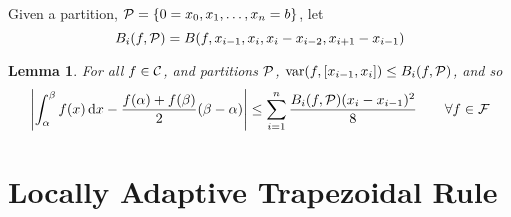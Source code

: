\documentclass{amsart}
\newtheorem{lem}[thm]{Lemma}
\DeclareMathOperator{\Var}{var}
\begin{document}
Given a partition, $\mathcal{P}  = \{0 = x_0, x_1, \ldots, x_n = b\}$, let
\[
B_i(f,\mathcal{P}) = B(f,x_{i-1},x_{i},x_{i} - x_{i-2}, x_{i+1}-x_{i-1})
\]

\begin{lem}  For all $f \in \mathcal{C}$, and partitions $\mathcal{P}$, $\Var(f,[x_{i-1},x_i]) \le B_i(f,\cp)$, and so
	\begin{equation}
		\left \lvert \int_{\alpha}^{\beta} f(x) \, {\rm d} x - \frac{f(\alpha)+f(\beta)}{2}(\beta - \alpha) \right \rvert \le \sum_{i=1}^n \frac{B_i(f,\mathcal{P})(x_i - x_{i-1})^2}{8} \qquad \forall f \in \mathcal{F}
	\end{equation}


	\end{lem}


\section{Locally Adaptive Trapezoidal Rule}
\end{document}
